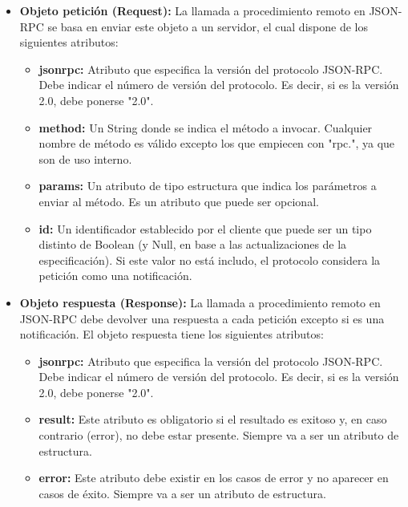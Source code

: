 \documentclass[spanish,12pt, a4paper, twoside]{paper}
\begin{document}
\begin{itemize}
\item \textbf{Objeto petición (Request):} La llamada a procedimiento remoto en JSON-RPC se basa en enviar este objeto a un servidor, el cual dispone de los siguientes atributos:

\begin{itemize}
\item \textbf{jsonrpc:} Atributo que especifica la versión del protocolo JSON-RPC. Debe indicar el número de versión del protocolo. Es decir, si es la versión 2.0, debe ponerse "2.0".

\item \textbf{method:} Un String donde se indica el método a invocar. Cualquier nombre de método es válido excepto los que empiecen con "rpc.", ya que son de uso interno.

\item \textbf{params:} Un atributo de tipo estructura que indica los parámetros a enviar al método. Es un atributo que puede ser opcional.

\item \textbf{id:} Un identificador establecido por el cliente que puede ser un tipo distinto de Boolean (y Null, en base a las actualizaciones de la especificación). Si este valor no está includo, el protocolo considera la petición como una notificación.
\end{itemize}

\item \textbf{Objeto respuesta (Response):} La llamada a procedimiento remoto en JSON-RPC debe devolver una respuesta a cada petición excepto si es una notificación. El objeto respuesta tiene los siguientes atributos:

\begin{itemize}
\item \textbf{jsonrpc:} Atributo que especifica la versión del protocolo JSON-RPC. Debe indicar el número de versión del protocolo. Es decir, si es la versión 2.0, debe ponerse "2.0".

\item \textbf{result:} Este atributo es obligatorio si el resultado es exitoso y, en caso contrario (error), no debe estar presente. Siempre va a ser un atributo de estructura.

\item \textbf{error:} Este atributo debe existir en los casos de error y no aparecer en casos de éxito. Siempre va a ser un atributo de estructura.


\end{itemize}
\end{itemize}
\end{document}
